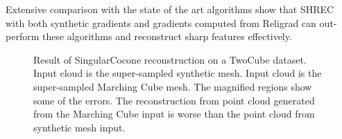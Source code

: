 Extensive comparison with the state of the art algorithms show that SHREC with both synthetic gradients and gradients computed from Religrad can out-perform these algorithms and reconstruct sharp features effectively. 


\begin{figure}[t] 
	\centering 
	\caption{Result of SingularCocone reconstruction on a TwoCube dataset. \protect{} Input cloud is the super-sampled synthetic mesh. \protect{} Input cloud is the super-sampled Marching Cube mesh. The magnified regions show some of the errors. The reconstruction from point cloud generated from the Marching Cube input is worse than the  point cloud from synthetic mesh input. }
	\label{fig:cocone_compare_from_perfect_1}
	\vskip-0.2cm
\end{figure} 

